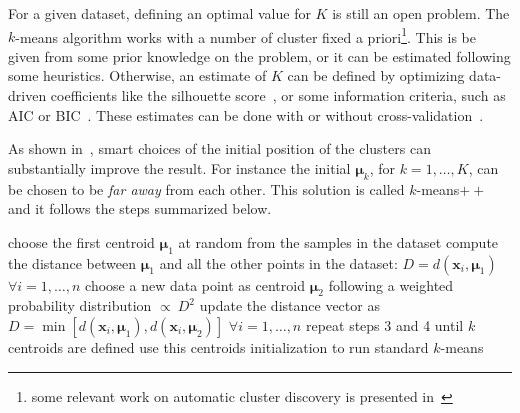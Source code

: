     For a given dataset, defining an optimal value for $K$ is still an open problem. The $k$-means algorithm works with a number of cluster fixed a priori\footnote{some relevant work on automatic cluster discovery is presented in~\cite{ball1967clustering, pelleg2000x, muhr2009automatic}}.
    This is be given from some prior knowledge on the problem, or it can be estimated following some heuristics. Otherwise, an estimate of $K$ can be defined by optimizing data-driven coefficients like the silhouette score~\cite{rousseeuw1987silhouettes}, or some information criteria, such as \ac{AIC} or \ac{BIC}~\cite{bishop2006pattern}.
    These estimates can be done with or without cross-validation~\cite{fiorini2017adenine}.
    
    As shown in~\cite{arthur2007k}, smart choices of the initial position of the clusters can substantially improve the result. For instance the initial $\bm{\mu}_k$, for $k=1,\dots,K$, can be chosen to be \textit{far away} from each other.
    This solution is called $k$-means$++$ and it follows the steps summarized below.

	\begin{algorithm}[h!]
		\begin{algorithmic}[1]
			\State choose the first centroid $\bm{\mu}_1$ at random from the samples in the dataset
			\State compute the distance between $\bm{\mu}_1$ and all the other points in the dataset: $D = d(\bm{x}_i, \bm{\mu}_1)$ $\forall i=1,\dots,n$
			\State choose a new data point as centroid $\bm{\mu}_2$ following a weighted probability distribution $\propto~D^2$
			\State update the distance vector as $D = \min[d(\bm{x}_i, \bm{\mu}_1), d(\bm{x}_i, \bm{\mu}_2)]$ $\forall i=1,\dots,n$
			\State repeat steps 3 and 4 until $k$ centroids are defined
			\State use this centroids initialization to run standard $k$-means
		\end{algorithmic}
	\end{algorithm}


